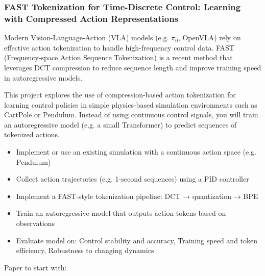 \documentclass[a4paper]{article}
\begin{document}
\subsubsection{FAST Tokenization for Time-Discrete Control: Learning with Compressed Action Representations}
Modern Vision-Language-Action (VLA) models (e.g. $\pi_0$, OpenVLA) rely on effective action tokenization to handle high-frequency control data. FAST (Frequency-space Action Sequence Tokenization) is a recent method that leverages DCT compression to reduce sequence length and improve training speed in autoregressive models. 

This project explores the use of compression-based action tokenization for learning control policies in simple physics-based simulation environments such as CartPole or Pendulum. Instead of using continuous control signals, you will train an autoregressive model (e.g. a small Transformer) to predict sequences of tokenized actions.
\begin{itemize}
	\item Implement or use an existing simulation with a continuous action space (e.g. Pendulum)
	\item Collect action trajectories (e.g. 1-second sequences) using a PID controller
	\item Implement a FAST-style tokenization pipeline: DCT → quantization → BPE
	\item Train an autoregressive model that outputs action tokens based on observations
	\item Evaluate model on: Control stability and accuracy, Training speed and token efficiency, Robustness to changing dynamics
\end{itemize}
Paper to start with: %
\end{document}
